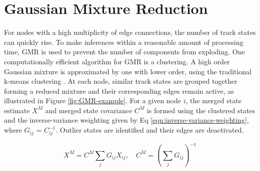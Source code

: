 




\section{Gaussian Mixture Reduction}
For nodes with a high multiplicity of edge connections, the number of track states can quickly rise. To make inferences within a reasonable amount of processing time, GMR is used to prevent the number of components from exploding. One computationally efficient algorithm for GMR is a clustering. A high order Gaussian mixture is approximated by one with lower order, using the traditional k-means clustering \cite{kmeans}. At each node, similar track states are grouped together forming a reduced mixture and their corresponding edges remain active, as illustrated in Figure \ref{fig:GMR-example}. For a given node $i$, the merged state estimate $X^{M}$ and merged state covariance $C^{M}$ is formed using the clustered states and the inverse-variance weighting \cite{inverse-variance-weighting} given by Eq \eqref{eqn:inverse-variance-weighting}, where $G_{ij}$ = $C_{ij}^{-1}$. Outlier states are identified and their edges are deactivated.

\begin{equation}
    X^{M} = C^{M} \sum_{j} G_{ij} X_{ij},  \quad  C^{M} = \left( \sum_{j} G_{ij} \right) ^{-1}
    \label{eqn:inverse-variance-weighting}
\end{equation}


